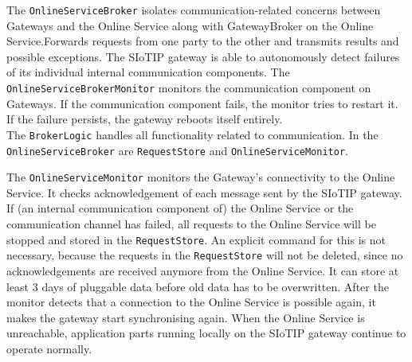             The \texttt{OnlineServiceBroker} isolates communication-related concerns between Gateways and the Online Service
            along with GatewayBroker on the Online Service.Forwards requests from one party to the other and transmits results and 
            possible exceptions.
            The SIoTIP gateway is able to autonomously detect failures of its individual internal communication components.
            The  \texttt{OnlineServiceBrokerMonitor} monitors the communication component on Gateways. 
            If the communication component fails, the monitor tries to restart it. If the failure persists, 
            the gateway reboots itself entirely.\\
            The \texttt{BrokerLogic} handles all functionality related to communication. In the \texttt{OnlineServiceBroker} 
            are \texttt{RequestStore} and \texttt{OnlineServiceMonitor}. 

            The \texttt{OnlineServiceMonitor} monitors the Gateway's connectivity to the Online Service. It checks acknowledgement of each
            message sent by the SIoTIP gateway. If (an internal communication component of) the Online Service or the communication
            channel has failed, all requests to the Online Service will be stopped and stored in the \texttt{RequestStore}. An explicit command for this is not necessary,
            because the requests in the \texttt{RequestStore} will not be deleted, since no acknowledgements are received
            anymore from the Online Service. It can store at least 3 days of pluggable data before old data has to be overwritten. 
            After the monitor detects that a connection to the Online Service is possible
            again, it makes the gateway start synchronising again. When the Online Service is unreachable, application 
            parts running locally on the SIoTIP gateway continue to operate normally.
            
            
